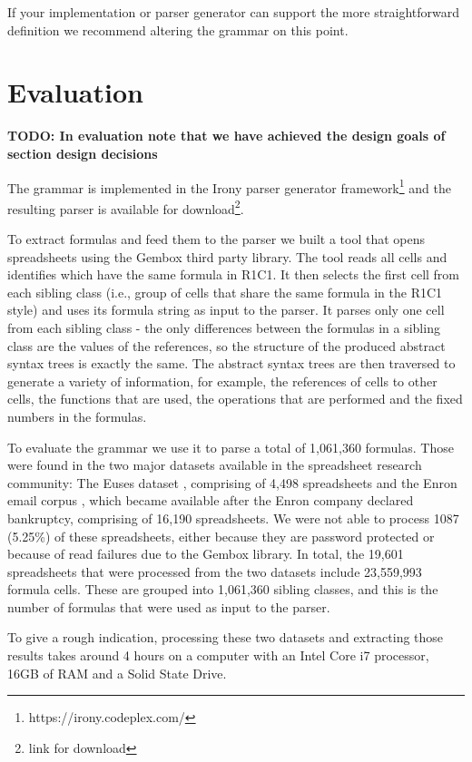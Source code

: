\documentclass[conference]{IEEEtran}
\newcommand{\todo}[1]{\textbf{TODO: #1}}
\begin{document}
If your implementation or parser generator can support the more straightforward definition we recommend altering the grammar on this point.


\section{Evaluation}
\label{sec:evaluation}

\todo{In evaluation note that we have achieved the design goals of section design decisions}

The grammar is implemented in the Irony parser generator framework\footnote{https://irony.codeplex.com/} and the resulting parser is available for download\footnote{link for download}.

To extract formulas and feed them to the parser we built a tool that opens spreadsheets using the Gembox third party library. The tool reads all cells and identifies which have the same formula in R1C1. It then selects the first cell from each sibling class (i.e., group of cells that share the same formula in the R1C1 style) and uses its formula string as input to the parser. It parses only one cell from each sibling class - the only differences between the formulas in a sibling class are the values of the references, so the structure of the produced abstract syntax trees is exactly the same. The abstract syntax trees are then traversed to generate a variety of information, for example, the references of cells to other cells, the functions that are used, the operations that are performed and the fixed numbers in the formulas.

To evaluate the grammar we use it to parse a total of 1,061,360 formulas. Those were found in the two major datasets available in the spreadsheet research community: The Euses dataset \cite{euses}, comprising of 4,498 spreadsheets and the Enron email corpus \cite{enron}, which became available after the Enron company declared bankruptcy, comprising of 16,190 spreadsheets. We were not able to process 1087 (5.25\%) of these spreadsheets, either because they are password protected or because of read failures due to the Gembox library. In total, the 19,601 spreadsheets that were processed from the two datasets include 23,559,993 formula cells. These are grouped into 1,061,360 sibling classes, and this is the number of formulas that were used as input to the parser.

To give a rough indication, processing these two datasets and extracting those results takes around 4 hours on a computer with an Intel Core i7 processor, 16GB of RAM and a Solid State Drive.
\end{document}
